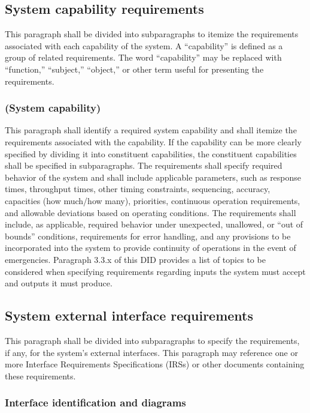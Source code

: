 \documentclass{fidata-report-template}
\begin{document}
\subsection{System capability requirements}

This paragraph shall be divided into subparagraphs to itemize the
requirements associated with each capability of the system. A
``capability'' is defined as a group of related requirements. The word
``capability'' may be replaced with ``function,'' ``subject,''
``object,'' or other term useful for presenting the requirements.

\subsubsection{(System capability)}

This paragraph shall identify a required system capability and shall
itemize the requirements associated with the capability. If the
capability can be more clearly specified by dividing it into constituent
capabilities, the constituent capabilities shall be specified in
subparagraphs. The requirements shall specify required behavior of the
system and shall include applicable parameters, such as response times,
throughput times, other timing constraints, sequencing, accuracy,
capacities (how much/how many), priorities, continuous operation
requirements, and allowable deviations based on operating conditions.
The requirements shall include, as applicable, required behavior under
unexpected, unallowed, or ``out of bounds'' conditions, requirements for
error handling, and any provisions to be incorporated into the system to
provide continuity of operations in the event of emergencies. Paragraph
3.3.x of this DID provides a list of topics to be considered when
specifying requirements regarding inputs the system must accept and
outputs it must produce.

\subsection{System external interface requirements}

This paragraph shall be divided into subparagraphs to specify the
requirements, if any, for the system's external interfaces. This
paragraph may reference one or more Interface Requirements
Specifications (IRSs) or other documents containing these requirements.

\subsubsection{Interface identification and diagrams}
\end{document}
